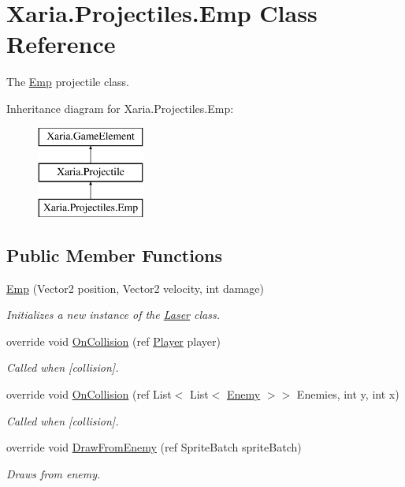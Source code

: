 \hypertarget{classXaria_1_1Projectiles_1_1Emp}{}\section{Xaria.\+Projectiles.\+Emp Class Reference}
\label{classXaria_1_1Projectiles_1_1Emp}


The \hyperlink{classXaria_1_1Projectiles_1_1Emp}{Emp} projectile class.  


Inheritance diagram for Xaria.\+Projectiles.\+Emp\+:\begin{figure}[H]
\begin{center}
\leavevmode
\includegraphics[height=3.000000cm]{classXaria_1_1Projectiles_1_1Emp}
\end{center}
\end{figure}
\subsection*{Public Member Functions}
\begin{DoxyCompactItemize}
\item 
\hyperlink{classXaria_1_1Projectiles_1_1Emp_a3911883ab0a8d20bf0b23b45a67ffc59}{Emp} (Vector2 position, Vector2 velocity, int damage)
\begin{DoxyCompactList}\small\item\em Initializes a new instance of the \hyperlink{classXaria_1_1Projectiles_1_1Laser}{Laser} class. \end{DoxyCompactList}\item 
override void \hyperlink{classXaria_1_1Projectiles_1_1Emp_a08ccc50483dd74dacf633f820592cd04}{On\+Collision} (ref \hyperlink{classXaria_1_1Player}{Player} player)
\begin{DoxyCompactList}\small\item\em Called when \mbox{[}collision\mbox{]}. \end{DoxyCompactList}\item 
override void \hyperlink{classXaria_1_1Projectiles_1_1Emp_a845adf4efc1dc6c222c72a554a98ba15}{On\+Collision} (ref List$<$ List$<$ \hyperlink{classXaria_1_1Enemy}{Enemy} $>$$>$ Enemies, int y, int x)
\begin{DoxyCompactList}\small\item\em Called when \mbox{[}collision\mbox{]}. \end{DoxyCompactList}\item 
override void \hyperlink{classXaria_1_1Projectiles_1_1Emp_a9eded776a417679715918b35bfcba6d7}{Draw\+From\+Enemy} (ref Sprite\+Batch sprite\+Batch)
\begin{DoxyCompactList}\small\item\em Draws from enemy. \end{DoxyCompactList}\end{DoxyCompactItemize}
